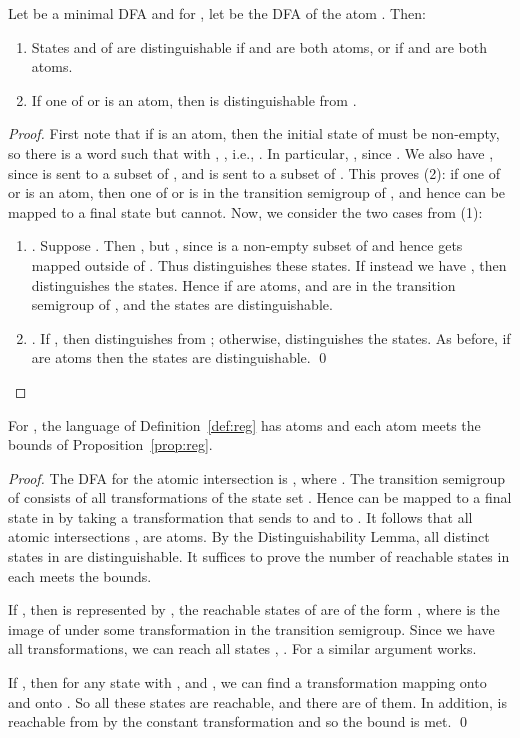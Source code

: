 \documentclass{llncs}
\newcommand{\be}{\begin{enumerate}}
\newcommand{\ee}{\end{enumerate}}
\newcommand{\distlemma}{the Distinguishability Lemma}
\begin{document}
\begin{lemma}[Distinguishability]
\label{lem:dist}
Let  be a minimal DFA and for , let  be the DFA of the atom . Then:
\be
\item
States  and  of  are distinguishable 
if  and  are both atoms, or if  and  are both atoms.
\item
If one of  or  is an atom, then  is distinguishable from .
\ee
\end{lemma}
\begin{proof}
First note that if  is an atom, then the initial state of  must be non-empty, so there is a word  such that  with , , i.e., . In particular, , since . We also have , since  is sent to a subset of , and  is sent to a subset of . This proves (2): if one of  or  is an atom, then one of  or  is in the transition semigroup of , and hence  can be mapped to a final state but  cannot.
Now, we consider the two cases from (1):
\be
\item
. Suppose . Then , but , since  is a non-empty subset of  and hence gets mapped outside of . Thus  distinguishes these states. If instead we have , then  distinguishes the states. Hence if  are atoms,  and  are in the transition semigroup of , and the states are distinguishable.
\item
. If , then  distinguishes  from ; otherwise,  distinguishes the states. As before, if  are atoms then the states are distinguishable. \qed
\ee
\end{proof}


\begin{theorem}
For , the language  of Definition~\ref{def:reg} has  atoms and each atom meets the bounds of Proposition~\ref{prop:reg}.
\end{theorem}
\begin{proof}
The DFA for the atomic intersection  is 
, where
 . 
 The transition semigroup of  consists of all  transformations of the state set .
Hence  can be mapped to a final state in  by taking a transformation that sends  to  and  to . 
It follows that all  atomic intersections ,  are atoms. By \distlemma, all distinct states in  are distinguishable. It suffices to prove the number of reachable states in each  meets the bounds.

 If ,
 then  is represented by , the reachable states of  are of the form 
, where  is the image of  under some transformation in the transition semigroup.
Since we have all transformations, we can reach all  states , . For  a similar argument works.

If , then for any state  with ,  and , we can find a transformation mapping  onto  and  onto .
So all these states are reachable, and there are  of them.
In addition,  is reachable from  by the constant transformation  and so  the bound is met.
\qed
\end{proof}
\end{document}
